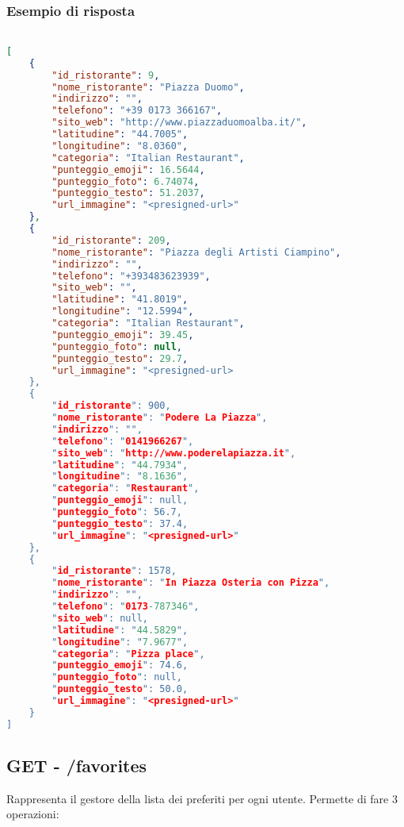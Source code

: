 \subsubsection{Esempio di risposta}
\begin{lstlisting}[language=json, caption={Esempio di richiesta \texttt{/searchByName}}, captionpos=b]

[
    {
        "id_ristorante": 9,
        "nome_ristorante": "Piazza Duomo",
        "indirizzo": "",
        "telefono": "+39 0173 366167",
        "sito_web": "http://www.piazzaduomoalba.it/",
        "latitudine": "44.7005",
        "longitudine": "8.0360",
        "categoria": "Italian Restaurant",
        "punteggio_emoji": 16.5644,
        "punteggio_foto": 6.74074,
        "punteggio_testo": 51.2037,
        "url_immagine": "<presigned-url>"
    },
    {
        "id_ristorante": 209,
        "nome_ristorante": "Piazza degli Artisti Ciampino",
        "indirizzo": "",
        "telefono": "+393483623939",
        "sito_web": "",
        "latitudine": "41.8019",
        "longitudine": "12.5994",
        "categoria": "Italian Restaurant",
        "punteggio_emoji": 39.45,
        "punteggio_foto": null,
        "punteggio_testo": 29.7,
        "url_immagine": "<presigned-url>
    },
    {
        "id_ristorante": 900,
        "nome_ristorante": "Podere La Piazza",
        "indirizzo": "",
        "telefono": "0141966267",
        "sito_web": "http://www.poderelapiazza.it",
        "latitudine": "44.7934",
        "longitudine": "8.1636",
        "categoria": "Restaurant",
        "punteggio_emoji": null,
        "punteggio_foto": 56.7,
        "punteggio_testo": 37.4,
        "url_immagine": "<presigned-url>"
    },
    {
        "id_ristorante": 1578,
        "nome_ristorante": "In Piazza Osteria con Pizza",
        "indirizzo": "",
        "telefono": "0173-787346",
        "sito_web": null,
        "latitudine": "44.5829",
        "longitudine": "7.9677",
        "categoria": "Pizza place",
        "punteggio_emoji": 74.6,
        "punteggio_foto": null,
        "punteggio_testo": 50.0,
        "url_immagine": "<presigned-url>"
    }
]
\end{lstlisting}

\pagebreak

\subsection{GET - /favorites} 
Rappresenta il gestore della lista dei preferiti per ogni utente. Permette di fare 3 operazioni:

